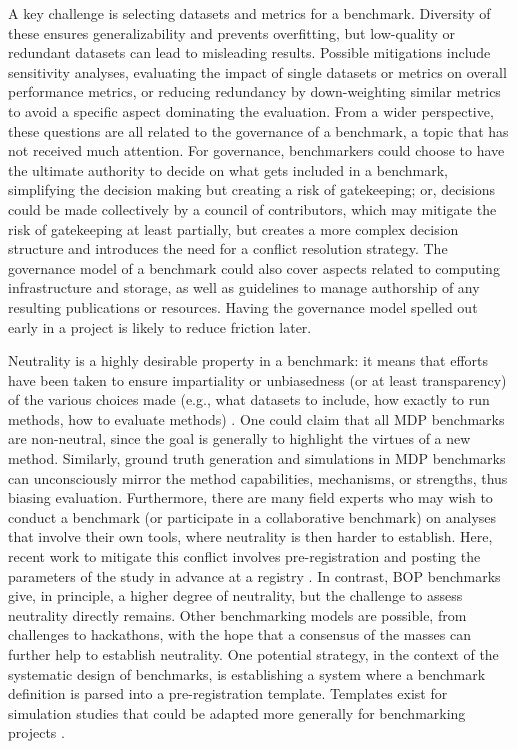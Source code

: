 \documentclass[11pt]{article}
\begin{document}
A key challenge is selecting datasets and metrics for a benchmark. Diversity of these ensures generalizability and prevents overfitting, but low-quality or redundant datasets can lead to misleading results. Possible mitigations include sensitivity analyses, evaluating the impact of single datasets or metrics on overall performance metrics, or reducing redundancy by down-weighting similar metrics to avoid a specific aspect dominating the evaluation. From a wider perspective, these questions are all related to the governance of a benchmark, a topic that has not received much attention. For governance, benchmarkers could choose to have the ultimate authority to decide on what gets included in a benchmark, simplifying the decision making but creating a risk of gatekeeping; or, decisions could be made collectively by a council of contributors, which may mitigate the risk of gatekeeping at least partially, but creates a more complex decision structure and introduces the need for a conflict resolution strategy. The governance model of a benchmark could also cover aspects related to computing infrastructure and storage, as well as guidelines to manage authorship of any resulting publications or resources. Having the governance model spelled out early in a project is likely to reduce friction later.

Neutrality is a highly desirable property in a benchmark: it means that efforts have been taken to ensure impartiality or unbiasedness (or at least transparency) of the various choices made (e.g., what datasets to include, how exactly to run methods, how to evaluate methods) \cite{Weber2019-el, Jelizarow2010-kr}. One could claim that all MDP benchmarks are non-neutral, since the goal is generally to highlight the virtues of a new method. Similarly, ground truth generation and simulations in MDP benchmarks can unconsciously mirror the method capabilities, mechanisms, or strengths, thus biasing evaluation. Furthermore, there are many field experts who may wish to conduct a benchmark (or participate in a collaborative benchmark) on analyses that involve their own tools, where neutrality is then harder to establish. Here, recent work to mitigate this conflict involves pre-registration and posting the parameters of the study in advance at a registry \cite{Sullivan2019-wh, Olevska2021-if, Teo2024-wk}. In contrast, BOP benchmarks give, in principle, a higher degree of neutrality, but the challenge to assess neutrality directly remains. Other benchmarking models are possible, from challenges to hackathons, with the hope that a consensus of the masses can further help to establish neutrality. One potential strategy, in the context of the systematic design of benchmarks, is establishing a system where a benchmark definition is parsed into a pre-registration template. Templates exist for simulation studies that could be adapted more generally for benchmarking projects \cite{Siepe2023-tz}. 
\end{document}
